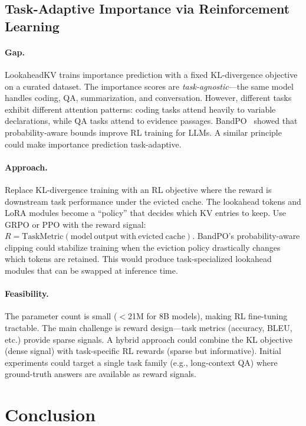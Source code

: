 \documentclass[11pt]{article}
\begin{document}
\subsection{Task-Adaptive Importance via Reinforcement Learning}

\paragraph{Gap.}
LookaheadKV trains importance prediction with a fixed KL-divergence objective on a curated dataset. The importance scores are \emph{task-agnostic}---the same model handles coding, QA, summarization, and conversation. However, different tasks exhibit different attention patterns: coding tasks attend heavily to variable declarations, while QA tasks attend to evidence passages. BandPO~\cite{bandpo} showed that probability-aware bounds improve RL training for LLMs. A similar principle could make importance prediction task-adaptive.

\paragraph{Approach.}
Replace KL-divergence training with an RL objective where the reward is downstream task performance under the evicted cache. The lookahead tokens and LoRA modules become a ``policy'' that decides which KV entries to keep. Use GRPO or PPO with the reward signal: $R = \mathrm{TaskMetric}(\mathrm{model\ output\ with\ evicted\ cache})$. BandPO's probability-aware clipping could stabilize training when the eviction policy drastically changes which tokens are retained. This would produce task-specialized lookahead modules that can be swapped at inference time.

\paragraph{Feasibility.}
The parameter count is small ($<$21M for 8B models), making RL fine-tuning tractable. The main challenge is reward design---task metrics (accuracy, BLEU, etc.) provide sparse signals. A hybrid approach could combine the KL objective (dense signal) with task-specific RL rewards (sparse but informative). Initial experiments could target a single task family (e.g., long-context QA) where ground-truth answers are available as reward signals.

\section{Conclusion}
\end{document}
